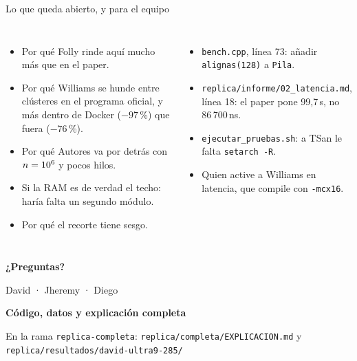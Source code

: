 \begin{frame}{Lo que queda abierto, y para el equipo}
  \begin{columns}[T]
    \begin{itemize}\footnotesize\setlength{\itemsep}{2pt}
      \item Por qué Folly rinde aquí mucho más que en el paper.
      \item Por qué Williams se hunde entre clústeres en el programa oficial, y más dentro de Docker ($-97$\,\%) que fuera ($-76$\,\%).
      \item Por qué Autores va por detrás con $n = 10\textsuperscript{6}$ y pocos hilos.
      \item Si la RAM es de verdad el techo: haría falta un segundo módulo.
      \item Por qué el recorte tiene sesgo.
    \end{itemize}
    \begin{itemize}\footnotesize\setlength{\itemsep}{2pt}
      \item \texttt{bench.cpp}, línea 73: añadir \texttt{alignas(128)} a \texttt{Pila}.
      \item \texttt{replica/informe/02\_latencia.md}, línea 18: el paper pone 99,7\,\textmu s, no 86\,700\,ns.
      \item \texttt{ejecutar\_pruebas.sh}: a TSan le falta \texttt{setarch -R}.
      \item Quien active a Williams en latencia, que compile con \texttt{-mcx16}.
    \end{itemize}
  \end{columns}
\end{frame}

{
\begin{frame}[plain]
  \vfill\centering
  {\color{white}\fontsize{28}{32}\selectfont\bfseries ¿Preguntas?\par}\bigskip
  {\color{azulclaro}\large David · Jheremy · Diego}\par\vfill
  {\color{white}\small\bfseries Código, datos y explicación completa}\par\medskip
  {\color{azulclaro}\small\repos}\par\medskip
  {\color{azulclaro}\scriptsize En la rama \texttt{replica-completa}: \texttt{replica/completa/EXPLICACION.md} y \texttt{replica/resultados/david-ultra9-285/}}
  \vspace*{6mm}
\end{frame}}
